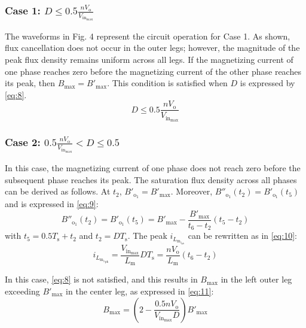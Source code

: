 \documentclass[lettersize,journal]{IEEEtran}
\begin{document}
\subsubsection*{\textup{Case 1:  $D \le 0.5 \frac{n V_{\mathrm{o}}}{V_{\mathrm{in}_{\mathrm{max}}}}$}}
The waveforms in Fig. 4 represent the circuit operation for Case 1. As shown, flux cancellation does not occur in the outer legs; however, the magnitude of the peak flux density remains uniform across all legs. If the magnetizing current of one phase reaches zero before the magnetizing current of the other phase reaches its peak, then $B_{\mathrm{max}} =  B'_{\mathrm{max}}$. This condition is satisfied when $D$ is expressed by \eqref{eq:8}.
\begin{equation}
\label{eq:8}
D \le 0.5 \frac{n V_{\mathrm{o}}}{V_{\mathrm{in}_{\mathrm{max}}}}
\end{equation}

\subsubsection*{\textup{Case 2: $0.5 \frac{n V_{\mathrm{o}}}{V_{\mathrm{in}_{\mathrm{max}}}} < D \le 0.5$}}
In this case, the magnetizing current of one phase does not reach zero before the subsequent phase reaches its peak. The saturation flux density across all phases can be derived as follows. At $t_2$, $B'_{\mathrm{o}_1} = B'_{\mathrm{max}}$. Moreover, $B''_{\mathrm{o}_1}(t_2) = B'_{\mathrm{o}_1}(t_5)$ and is expressed in \eqref{eq:9}:
\begin{equation}
\label{eq:9}
B''_{\mathrm{o}_1}(t_2) = B'_{\mathrm{o}_1}(t_5) = B'_{\mathrm{max}} - \frac{B'_{\mathrm{max}}}{t_6 - t_2}(t_5 - t_2)
\end{equation}
with $t_5 = 0.5 T_{\mathrm{s}} + t_2$ and $t_2 = D T_{\mathrm{s}}$. The peak $i_{L_{\mathrm{m}_{1_{\mathrm{pk}}}}}$ can be rewritten as in \eqref{eq:10}:
\begin{equation}
\label{eq:10}
i_{L_{{{\mathrm{m}_1}_{\mathrm{pk}}}}} = \frac{V_{\mathrm{in}_{\mathrm{max}}}}{L_{\mathrm{m}}} D T_{\mathrm{s}} = \frac{n V_{\mathrm{o}}}{L_{\mathrm{m}}}(t_6 - t_2)
\end{equation}

In this case, \eqref{eq:8} is not satisfied, and this results in $B_{\mathrm{max}}$ in the left outer leg exceeding $B'_{\mathrm{max}}$ in the center leg, as expressed in \eqref{eq:11}:
\begin{equation}
\label{eq:11}
B_{\mathrm{max}} = \left(2 - \frac{0.5 n V_{\mathrm{o}}}{V_{\mathrm{in}_{\mathrm{max}}} D}\right) B'_{\mathrm{max}}
\end{equation}
\end{document}
